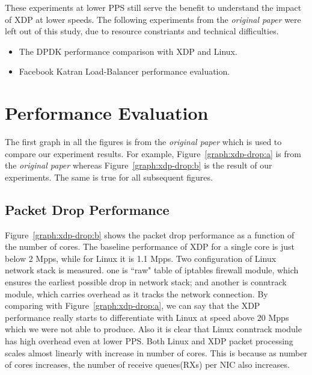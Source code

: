 \documentclass[12pt,titlepage]{article}
\begin{document}
These experiments at lower PPS still serve the benefit to understand the impact of XDP at lower speeds.
The following experiments from the \textit{original paper} were left out of this study, due to resource constriants and technical difficulties. 
\begin{itemize}
  \item The DPDK performance comparison with XDP and Linux.
  \item Facebook Katran Load-Balancer performance evaluation. 
\end{itemize}


\section{Performance Evaluation}

The first graph in all the figures is from the \textit{original paper} which is used to compare our experiment results. 
For example, Figure~\ref{graph:xdp-drop:a} is from the \textit{original paper} whereas Figure~\ref{graph:xdp-drop:b} is the result of our experiments. The same is true for all subsequent figures.


\subsection{Packet Drop Performance}


Figure~\ref{graph:xdp-drop:b} shows the packet drop performance as a function of the number of cores. The baseline performance of XDP for a single core is just below 2 Mpps, while for Linux it is 1.1 Mpps. Two configuration of Linux network stack is measured. one is ``raw" table of iptables firewall module, which ensures the earliest possible drop in network stack; and another is conntrack module, which carries overhead as it tracks the network connection. By comparing with Figure~\ref{graph:xdp-drop:a}, we can say that the XDP performance really starts to differentiate with Linux at speed above 20 Mpps which we were not able to produce. Also it is clear that Linux conntrack module has high overhead even at lower PPS. Both Linux and XDP packet processing scales almost linearly with increase in number of cores. This is because as number of cores increases, the number of receive queues(RXs) per NIC also increases.
\end{document}
